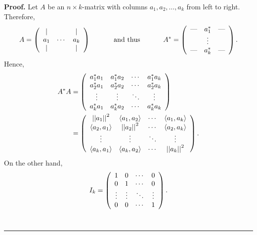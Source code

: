 \documentclass[numbers=enddot,12pt,final,onecolumn,notitlepage]{scrartcl}%
\numberwithin{exer}{subsection}
\theoremstyle{definition}
\newenvironment{proof}[1][Proof]{\noindent\textbf{#1.} }{\ \rule{0.5em}{0.5em}}
\begin{document}
\begin{proof}
Let $A$ be an $n\times k$-matrix with columns $a_{1},a_{2},\ldots,a_{k}$ from
left to right. Therefore,%
\[
A=\left(
\begin{array}
[c]{ccc}%
\mid &  & \mid\\
a_{1} & \cdots & a_{k}\\
\mid &  & \mid
\end{array}
\right)  \ \ \ \ \ \ \ \ \ \ \text{and thus}\ \ \ \ \ \ \ \ \ \ A^{\ast
}=\left(
\begin{array}
[c]{ccc}%
\text{---} & a_{1}^{\ast} & \text{---}\\
& \vdots & \\
\text{---} & a_{k}^{\ast} & \text{---}%
\end{array}
\right)  .
\]
Hence,%
\begin{align*}
A^{\ast}A  &  =\left(
\begin{array}
[c]{cccc}%
a_{1}^{\ast}a_{1} & a_{1}^{\ast}a_{2} & \cdots & a_{1}^{\ast}a_{k}\\
a_{2}^{\ast}a_{1} & a_{2}^{\ast}a_{2} & \cdots & a_{2}^{\ast}a_{k}\\
\vdots & \vdots & \ddots & \vdots\\
a_{k}^{\ast}a_{1} & a_{k}^{\ast}a_{2} & \cdots & a_{k}^{\ast}a_{k}%
\end{array}
\right) \\
&  =\left(
\begin{array}
[c]{cccc}%
\left\vert \left\vert a_{1}\right\vert \right\vert ^{2} & \left\langle
a_{1},a_{2}\right\rangle  & \cdots & \left\langle a_{1},a_{k}\right\rangle \\
\left\langle a_{2},a_{1}\right\rangle  & \left\vert \left\vert a_{2}%
\right\vert \right\vert ^{2} & \cdots & \left\langle a_{2},a_{k}\right\rangle
\\
\vdots & \vdots & \ddots & \vdots\\
\left\langle a_{k},a_{1}\right\rangle  & \left\langle a_{k},a_{2}\right\rangle
& \cdots & \left\vert \left\vert a_{k}\right\vert \right\vert ^{2}%
\end{array}
\right)  .
\end{align*}
On the other hand,%
\[
I_{k}=\left(
\begin{array}
[c]{cccc}%
1 & 0 & \cdots & 0\\
0 & 1 & \cdots & 0\\
\vdots & \vdots & \ddots & \vdots\\
0 & 0 & \cdots & 1
\end{array}
\right)  .
\]
\end{proof}
\end{document}
